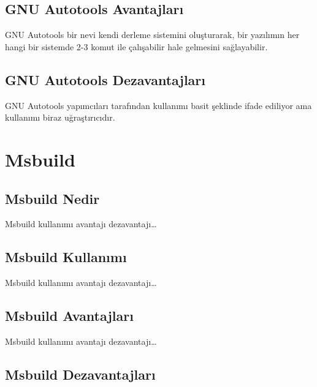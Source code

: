 \documentclass[
]{book}
\begin{document}
\hypertarget{gnu-autotools-avantajlarux131}{%
\section{GNU Autotools Avantajları}\label{gnu-autotools-avantajlarux131}}

GNU Autotools bir nevi kendi derleme sistemini oluşturarak, bir yazılımın her hangi bir sistemde 2-3 komut ile çalışabilir hale gelmesini sağlayabilir.

\hypertarget{gnu-autotools-dezavantajlarux131}{%
\section{GNU Autotools Dezavantajları}\label{gnu-autotools-dezavantajlarux131}}

GNU Autotools yapımcıları tarafından kullanımı basit şeklinde ifade ediliyor ama kullanımı biraz uğraştırıcıdır.

\hypertarget{msbuild}{%
\chapter{Msbuild}\label{msbuild}}

\hypertarget{msbuild-nedir}{%
\section{Msbuild Nedir}\label{msbuild-nedir}}

Msbuild kullanımı avantajı dezavantajı\ldots{}

\hypertarget{msbuild-kullanux131mux131}{%
\section{Msbuild Kullanımı}\label{msbuild-kullanux131mux131}}

Msbuild kullanımı avantajı dezavantajı\ldots{}

\hypertarget{msbuild-avantajlarux131}{%
\section{Msbuild Avantajları}\label{msbuild-avantajlarux131}}

Msbuild kullanımı avantajı dezavantajı\ldots{}

\hypertarget{msbuild-dezavantajlarux131}{%
\section{Msbuild Dezavantajları}\label{msbuild-dezavantajlarux131}}
\end{document}
